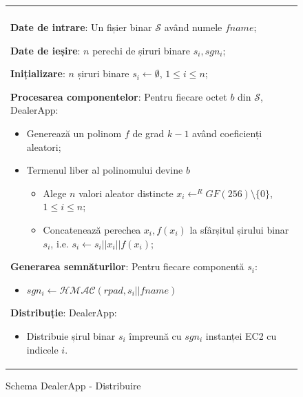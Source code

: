 \documentclass[oneside, 12pt]{book}
\begin{document}
\begin{figure}[h!]

\begin{tabular}{|p{\textwidth}|}
\hline

\\
\hspace{.1in}
\textbf{Date de intrare}: Un fișier binar $\mathcal{S}$ având numele $fname$;
\medskip

\hspace{.1in}
\textbf{Date de ieșire}: $n$ perechi de șiruri binare $s_i, sgn_i$;
\medskip

\hspace{.1in}
\textbf{Inițializare}: $n$ șiruri binare $s_i \leftarrow \emptyset$, $1 \leq i \leq n$;
\medskip

\hspace{.1in}
\textbf{Procesarea componentelor}: Pentru fiecare octet $b$ din $\mathcal{S}$, DealerApp:
	\begin{itemize}
		\item Generează un polinom $f$ de grad $k - 1$ având coeficienți aleatori;
		\item Termenul liber al polinomului devine $b$
		\begin{itemize}
			\item Alege $n$ valori aleator distincte $x_i \leftarrow^R GF(256) \setminus \{0\}$, $1 \leq i \leq n$;
			\item Concatenează perechea $x_i, f(x_i)$ la sfârșitul șirului binar $s_i$, i.e. $s_i \leftarrow s_i || x_i || f(x_i)$;
		\end{itemize}
	\end{itemize}
\medskip

\hspace{.1in}
\medskip
\textbf{Generarea semnăturilor}: Pentru fiecare componentă $s_i$:
	\begin{itemize}
		\item $sgn_i \leftarrow \mathcal{HMAC}(rpad, s_i || fname)$
	\end{itemize}

\medskip
\hspace{.1in}	
\textbf{Distribuție}: DealerApp:
	\begin{itemize}
		\item Distribuie șirul binar $s_i$ împreună cu $sgn_i$ instanței EC2 cu indicele $i$.
	\end{itemize}

\\
\hline
\end{tabular}
\caption{Schema DealerApp - Distribuire}
\label{fig:dealerapp_distribution}
\end{figure}
\end{document}
